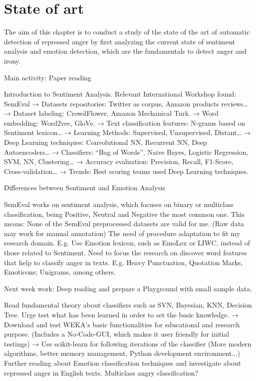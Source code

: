 \chapter{State of art}

The aim of this chapter is to conduct a study of the state of the art of automatic detection of repressed anger by first analyzing the current state of sentiment analysis and emotion detection, which are the fundamentals to detect anger and irony.





Main activity: Paper reading

Introduction to Sentiment Analysis.
Relevant International Workshop found: SemEval
→ Datasets repositories: Twitter as corpus, Amazon products reviews…
→ Dataset labeling: CrowdFlower, Amazon Mechanical Turk.
→ Word embedding: Word2vec, GloVe.
→ Text classification features: N-grams based on Sentiment lexicon…
→ Learning Methods: Supervised, Unsupervised, Distant…
→ Deep Learning techniques: Convolutional NN, Recurrent NN, Deep Autoencoders…
→ Classifiers: “Bag of Words”, Naive Bayes, Logistic Regression, SVM, NN, Clustering…
→ Accuracy evaluation: Precision, Recall, F1-Score, Cross-validation…
→ Trends: Best scoring teams used Deep Learning techniques.

Differences between Sentiment and Emotion Analysis

SemEval works on sentiment analysis, which focuses on binary or multiclass classification, being Positive, Neutral and Negative the most common one.
This means:
 None of the SemEval preprocessed datasets are valid for me. (Raw data may work for manual annotation)
 The need of procedure adaptation to fit my research domain.
E.g. Use Emotion lexicon, such as EmoLex or LIWC, instead of  those related to Sentiment.
Need to focus the research on discover word features that help to classify anger in texts.
E.g. Heavy Punctuation, Quotation Marks, Emoticons; Unigrams, among others.

Next week work: Deep reading and prepare a Playground with small sample data.

Read fundamental theory about classifiers such as SVN, Bayesian, KNN, Decision Tree.
Urge test what has been learned in order to set the basic knowledge.
→ Download and test WEKA’s basic functionalities for educational and research purpose. (Includes a No-Code-GUI, which makes it user friendly for initial testings)
→ Use scikit-learn for following iterations of the classifier (More modern algorithms, better memory management, Python development environment...)
Further reading about Emotion classification techniques and investigate about repressed anger in English texts. 
Multiclass angry classification?

